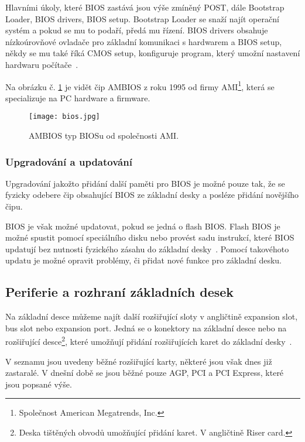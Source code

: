 Hlavními úkoly, které BIOS zastává jsou výše zmíněný POST, dále Bootstrap Loader,
BIOS drivers, BIOS setup. Bootstrap Loader se snaží najít
operační systém a pokud se mu to podaří, předá mu řízení. BIOS drivers obsahuje
nízkoúrovňové ovladače pro základní komunikaci s hardwarem
a BIOS setup, někdy se mu také říká CMOS setup, konfiguruje program, který
umožní nastavení hardwaru počítače~\cite{ref:mb:computerhope}.

Na obrázku č. \ref{fig:bios} je vidět čip AMBIOS z roku 1995 od firmy AMI\footnote{Společnost
American Megatrends, Inc.}, která se specializuje na PC hardware a firmware.

\begin{figure}[htbp]
  \centering
  \texttt{[image: bios.jpg]}
  \caption{AMBIOS typ BIOSu od společnosti AMI.~\cite{ref:mb:computerhope}}
  \label{fig:bios}
\end{figure}

\subsubsection{Upgradování a updatování}
Upgradování jakožto přidání další paměti pro BIOS je možné pouze tak, že se fyzicky odebere čip obsahující BIOS ze základní desky a posléze přidání
novějšího čipu.

BIOS je však možné updatovat, pokud se jedná o flash BIOS. Flash BIOS je možné
spustit pomocí speciálního disku nebo provést sadu instrukcí,
které BIOS updatují bez nutnosti fyzického zásahu do základní
desky~\cite{ref:mb:itstillworks}. Pomocí takovéhoto updatu je možné opravit
problémy, či přidat nové funkce pro základní desku.

\subsection{Periferie a rozhraní základních desek}
Na základní desce můžeme najít další rozšiřující sloty v angličtině expansion slot,
bus slot nebo expansion port. Jedná se o konektory na základní desce nebo
na rozšiřující desce\footnote{Deska tištěných obvodů umožňující přidání
karet. V angličtině Riser card.}, které umožňují přidání rozšiřujících karet
do základní desky~\cite{ref:mb:computerhope2}.

V seznamu jsou uvedeny běžné rozšiřující karty, některé jsou však dnes již
zastaralé. V dnešní době se jsou běžné pouze AGP, PCI a PCI Express, které jsou
popsané výše.

